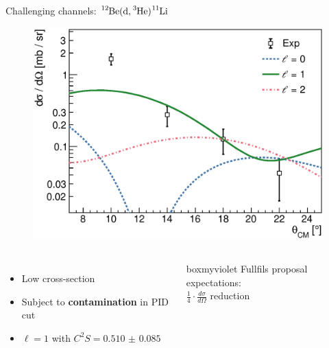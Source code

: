 \documentclass[sans,
frameno, %
mp,
usenames,dvipsnames, %
onlytextwidth, %
t,%
11pt]{beamer}
\newcommand{\iso}[2]{\ce{^{#1}#2}}
\begin{document}
\begin{frame}{Challenging channels: $\iso{12}{Be}(\textrm{d}, \iso{3}{He})\iso{11}{Li}$}
\begin{figure}
\begin{minipage}[t]{0.48\linewidth}
            \includegraphics[width=\textwidth]{figures/Workshop/12Be_d3He_xs.eps}
        \end{minipage}
    \end{figure}
    \bigskip
    \begin{columns}[c]
        {
            \begin{itemize}
                \item Low cross-section
                \item Subject to \textbf{contamination} in PID cut
                \item $\ell = 1$ with $C^{2}S = \num{0.510(85)}$
            \end{itemize}
        }\hfill
        {
            \begin{beamercolorbox}[sep=1ex, center, rounded=true]{boxmyviolet}
                Fullfils proposal expectations: \\
                $\frac{1}{4} \cdot \frac{d\sigma}{d\Omega}$ reduction
            \end{beamercolorbox}
        }
    \end{columns}
\end{frame}
\end{document}
